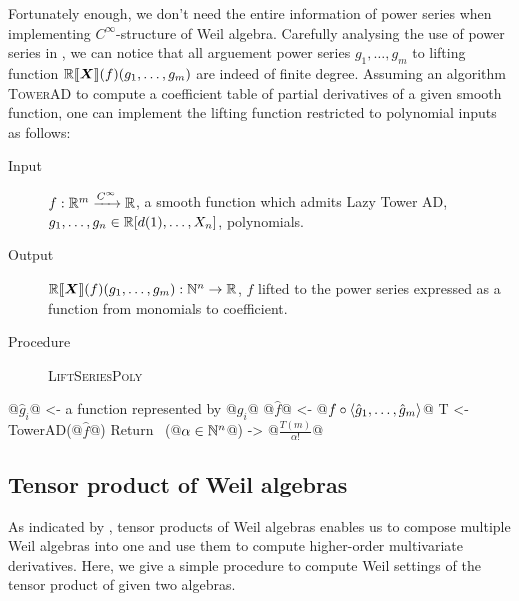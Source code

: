 \documentclass[%
  sigconf,authorversion,screen]{acmart}
\begin{document}
Fortunately enough, we don't need the entire information of power series when implementing $C^\infty$-structure of Weil algebra.
Carefully analysing the use of power series in , we can notice that all arguement power series $g_1, \dots, g_m$ to lifting function $\mathord{\mathbb{R}\llbracket\boldsymbol{X}\rrbracket}(f)(g_1, \dots, g_m)$ are indeed of finite degree.
Assuming an algorithm \textsc{TowerAD} to compute a coefficient table of partial derivatives of a given smooth function, one can implement the lifting function restricted to polynomial inputs as follows:

\begin{algorithm}\label{alg:lift-poly-series}
\hfill\vspace{-.25em}
\begin{description}
  \item[Input]
    $f: \mathbb{R}^m \xrightarrow{C^\infty} \mathbb{R}$, a smooth function which admits Lazy Tower AD,
    $g_1, \dots, g_n \in \mathbb{R}[d(1), \dots, X_n]$, polynomials.
  \item[Output] $\mathord{\mathbb{R}\llbracket\boldsymbol{X}\rrbracket}(f)(g_1, \dots, g_m): \mathbb{N}^n \to \mathbb{R}$, $f$ lifted to the power series expressed as a function from monomials to coefficient.
  \item[Procedure] \textup{\textsc{LiftSeriesPoly}}
\end{description}
\begin{alg}
@$\hat{g}_i$@ <- a function represented by @$g_i$@
@$\hat{f}$@ <- @$f \circ \braket{\hat{g}_1, \dots, \hat{g}_m}$@
T <- TowerAD(@$\hat f$@)
Return \ (@$\alpha \in \mathbb{N}^n$@) -> @$\frac{T(m)}{\alpha!}$@
\end{alg}
\end{algorithm}

\subsection{Tensor product of Weil algebras}
\label{sec:tensor-algorithm}
As indicated by , tensor products of Weil algebras enables us to compose multiple Weil algebras into one and use them to compute higher-order multivariate derivatives.
Here, we give a simple procedure to compute Weil settings of the tensor product of given two algebras.
\end{document}
